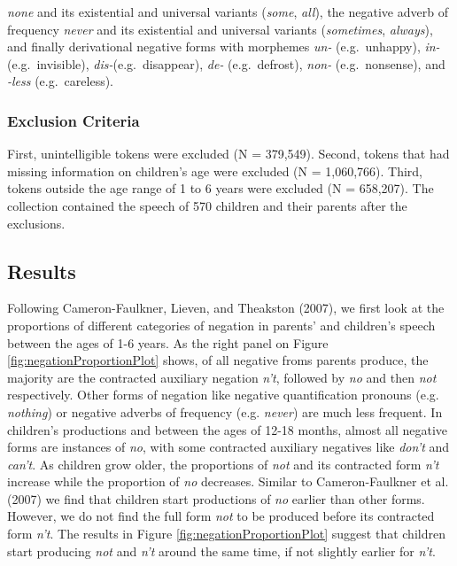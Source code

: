 \documentclass[man,floatsintext,draftall]{apa6}
\begin{document}
\emph{none} and its existential and universal variants (\emph{some}, \emph{all}), the negative adverb of frequency \emph{never} and its existential and universal variants (\emph{sometimes}, \emph{always}), and finally derivational negative forms with morphemes \emph{un-} (e.g.~unhappy), \emph{in-} (e.g.~invisible), \emph{dis-}(e.g.~disappear), \emph{de-} (e.g.~defrost), \emph{non-} (e.g.~nonsense), and \emph{-less} (e.g.~careless).

\hypertarget{exclusion-criteria}{%
\subsubsection{Exclusion Criteria}\label{exclusion-criteria}}

First, unintelligible tokens were excluded (N = 379,549). Second, tokens that had missing information on children's age were excluded (N = 1,060,766). Third, tokens outside the age range of 1 to 6 years were excluded (N = 658,207). The collection contained the speech of 570 children and their parents after the exclusions.

\hypertarget{results}{%
\subsection{Results}\label{results}}

Following Cameron-Faulkner, Lieven, and Theakston (2007), we first look at the proportions of different categories of negation in parents' and children's speech between the ages of 1-6 years. As the right panel on Figure \ref{fig:negationProportionPlot} shows, of all negative froms parents produce, the majority are the contracted auxiliary negation \emph{n't}, followed by \emph{no} and then \emph{not} respectively. Other forms of negation like negative quantification pronouns (e.g. \emph{nothing}) or negative adverbs of frequency (e.g. \emph{never}) are much less frequent. In children's productions and between the ages of 12-18 months, almost all negative forms are instances of \emph{no}, with some contracted auxiliary negatives like \emph{don't} and \emph{can't}. As children grow older, the proportions of \emph{not} and its contracted form \emph{n't} increase while the proportion of \emph{no} decreases. Similar to Cameron-Faulkner et al. (2007) we find that children start productions of \emph{no} earlier than other forms. However, we do not find the full form \emph{not} to be produced before its contracted form \emph{n't}. The results in Figure \ref{fig:negationProportionPlot} suggest that children start producing \emph{not} and \emph{n't} around the same time, if not slightly earlier for \emph{n't}.
\end{document}
